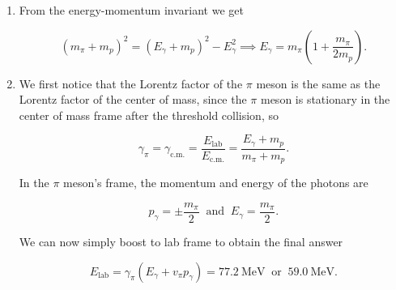 \documentclass[english,a4paper,12pt]{report}
\begin{document}
{\begin{enumerate}
    \item From the energy-momentum invariant we get 
    
    \begin{equation}
        (m_{\pi} + m_{p} )^2 = (E_{\gamma } + m_{p}  )^2 - E_{\gamma }^2 \implies E_{\gamma } = m_{\pi}\left( 1+\frac{m_{\pi} }{2m_{p} }  \right).
    \end{equation}
    
    \item We first notice that the Lorentz factor of the \(\pi \) meson is the same as the Lorentz factor of the center of mass, since the \(\pi \) meson is stationary in the center of mass frame after the threshold collision, so
    
    \begin{equation}
        \gamma _{\pi } = \gamma _{\text{c.m.} } = \frac{E_{\text{lab} } }{E_{\text{c.m.} } }=  \frac{E_{\gamma } + m_{p}  }{m_{\pi} + m_{p}  }.    
    \end{equation}
    
    In the \(\pi \) meson's frame, the momentum and energy of the photons are 
    
    \begin{equation}
        p_{\gamma } = \pm \frac{m_{\pi} }{2} ~\text { and }~ E_{\gamma } = \frac{m_{\pi} }{2}.    
    \end{equation}
    
    We can now simply boost to lab frame to obtain the final answer

    \begin{equation}
        E_{\text{lab} } = \gamma _{\pi } (E_{\gamma } + v_{\pi} p_{\gamma }   ) = \SI{77.2}{\MeV } ~\text { or }~ \SI{59.0}{\MeV }.  
    \end{equation}
\end{enumerate}
~
} 
\end{document}
